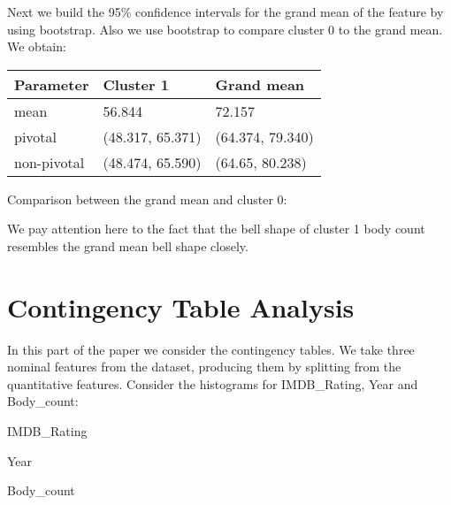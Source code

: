 \documentclass[a4paper,14pt]{article}
\begin{document}
\normalsize


Next we build the 95\% confidence intervals for the grand mean of the feature by using bootstrap. Also we use bootstrap to compare cluster 0 to the grand mean.  We obtain:


\begin{center}
	\begin{tabular}{|l|l|l|}
		\hline
		\textbf{Parameter} & \textbf{Cluster 1}  & \textbf{Grand mean}  \\ \hline
		mean & 56.844 & 72.157 \\ \hline
		pivotal & (48.317, 65.371) & (64.374, 79.340)  \\ \hline
		non-pivotal & (48.474, 65.590)  & (64.65, 80.238)  \\ \hline
	\end{tabular}
\end{center}

\normalsize

Comparison between the grand mean and cluster 0:
    \begin{center}
\end{center}
We pay attention here to the fact that the bell shape of cluster 1 body count resembles the grand mean bell shape closely.
    \begin{center}
\end{center}


    \section{Contingency Table Analysis}
    
In this part of the paper we consider the contingency tables. We take three nominal features from the dataset, producing them by splitting from the quantitative features. Consider the histograms for IMDB\_Rating, Year and Body\_count:

\begin{multicols}{2}
    \begin{center}
	IMDB\_Rating
\end{center}
\begin{center}
	Year
\end{center}
    \begin{center}
	 Body\_count
\end{center}

\end{multicols}
\end{document}
